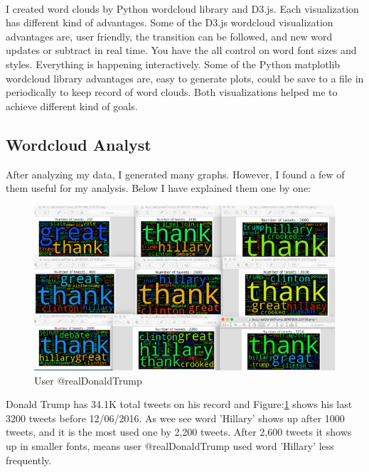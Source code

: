 \documentclass[12pt,notitlepage]{article}
\begin{document}
\
\\
I created word clouds by Python wordcloud library and D3.js. Each visualization has different kind of advantages. Some of the D3.js wordcloud visualization advantages are, user friendly, the transition can be followed, and new word updates or subtract in real time. You have the all control on word font sizes and styles. Everything is happening interactively. Some of the Python matplotlib wordcloud library advantages are, easy to generate plots, could be save to a file in periodically to keep record of word clouds. Both visualizations helped me to achieve different kind of goals.




\subsection{ Wordcloud Analyst} 

After analyzing my data, I generated many graphs. However, I found a few of them useful for my analysis. Below I have explained them one by one:\



\begin{figure}[htb]
	\centering
	\includegraphics[width=0.79\linewidth]{WordCloudAnalystGana_10.pdf}
	\caption{User @realDonaldTrump}
	\label{fig:WordCloudAnalystGana_10}
\end{figure}

Donald Trump has 34.1K total tweets on his record and Figure:\ref{fig:WordCloudAnalystGana_10} shows his last 3200 tweets before 12/06/2016. As wee see word 'Hillary' shows up after 1000 tweets, and it is the most used one by 2,200 tweets. After 2,600 tweets it shows up in smaller fonts, means user @realDonaldTrump used word 'Hillary' less frequently.
\end{document}
